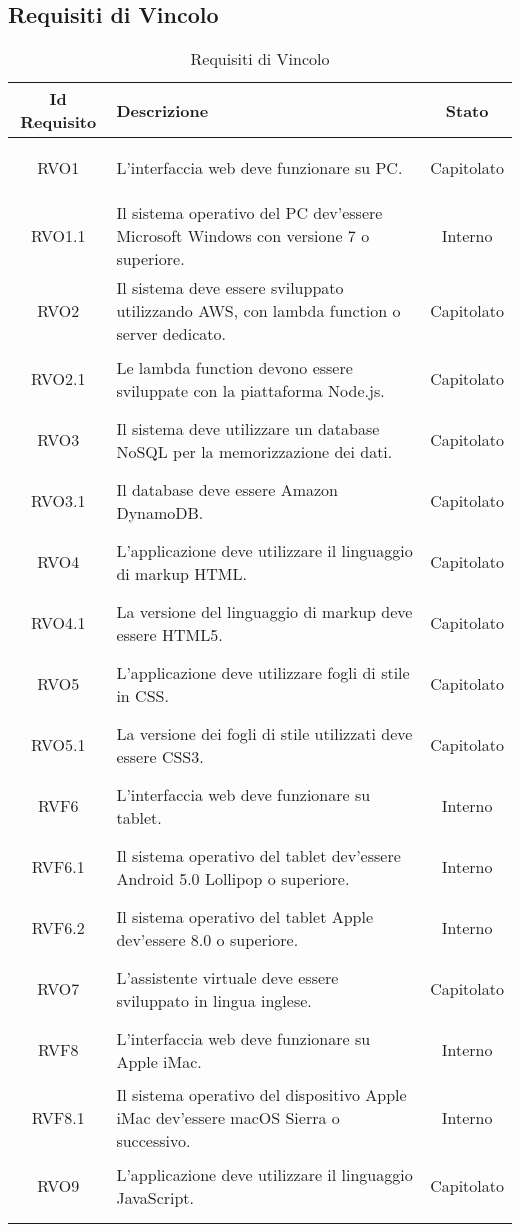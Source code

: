 \subsection{Requisiti di Vincolo}
\normalsize
\begin{longtable}{|c|>{\centering}m{7cm}|c|}
\hline
\textbf{Id Requisito} & \textbf{Descrizione} & \textbf{Stato}\\
\hline
\endhead\hypertarget{RVO1}{RVO1} & L'interfaccia web deve funzionare su PC. & Capitolato\\ \hline
\hypertarget{RVO1.1}{RVO1.1} & Il sistema operativo del PC dev'essere Microsoft Windows con versione 7 o superiore. & Interno\\ \hline
\hypertarget{RVO2}{RVO2} & Il sistema deve essere sviluppato utilizzando AWS, con lambda function o server dedicato. & Capitolato\\ \hline
\hypertarget{RVO2.1}{RVO2.1} & Le lambda function devono essere sviluppate con la piattaforma Node.js. & Capitolato\\ \hline
\hypertarget{RVO3}{RVO3} & Il sistema deve utilizzare un database NoSQL per la memorizzazione dei dati. & Capitolato\\ \hline
\hypertarget{RVO3.1}{RVO3.1} & Il database deve essere Amazon DynamoDB. & Capitolato\\ \hline
\hypertarget{RVO4}{RVO4} & L'applicazione deve utilizzare il linguaggio di markup HTML. & Capitolato\\ \hline
\hypertarget{RVO4.1}{RVO4.1} & La versione del linguaggio di markup deve essere HTML5. & Capitolato\\ \hline
\hypertarget{RVO5}{RVO5} & L’applicazione deve utilizzare fogli di stile in CSS. & Capitolato\\ \hline
\hypertarget{RVO5.1}{RVO5.1} & La versione dei fogli di stile utilizzati deve essere CSS3. & Capitolato\\ \hline
\hypertarget{RVF6}{RVF6} & L'interfaccia web deve funzionare su tablet. & Interno\\ \hline
\hypertarget{RVF6.1}{RVF6.1} & Il sistema operativo del tablet dev'essere Android 5.0 Lollipop o superiore. & Interno\\ \hline
\hypertarget{RVF6.2}{RVF6.2} & Il sistema operativo del tablet Apple dev'essere 8.0 o superiore. & Interno\\ \hline
\hypertarget{RVO7}{RVO7} & L'assistente virtuale deve essere sviluppato in lingua inglese. & Capitolato\\ \hline
\hypertarget{RVF8}{RVF8} & L'interfaccia web deve funzionare su Apple iMac. & Interno\\ \hline
\hypertarget{RVF8.1}{RVF8.1} & Il sistema operativo del dispositivo Apple iMac dev'essere macOS Sierra o successivo. & Interno\\ \hline
\hypertarget{RVO9}{RVO9} & L'applicazione deve utilizzare il linguaggio JavaScript. & Capitolato\\ \hline

\caption[Requisiti di Vincolo]{Requisiti di Vincolo}
\label{tabella:req3}
\end{longtable}
\clearpage
